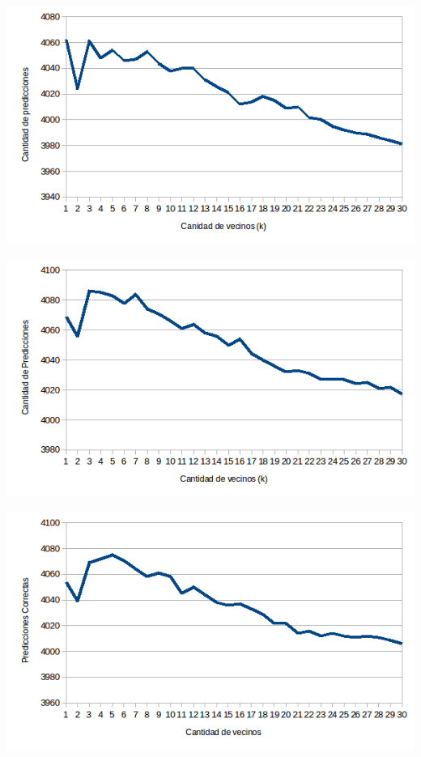 \begin{center}
\includegraphics[scale=0.55]{nuevosResultados/knn/2.png}
\end{center}

\begin{center}
\includegraphics[scale=0.55]{nuevosResultados/knn/3.png}
\end{center}
\begin{center}
\includegraphics[scale=0.55]{nuevosResultados/knn/4.png}
\end{center}


